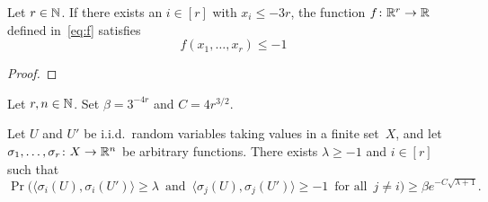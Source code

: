 \begin{lemma}
  \label{lem:special-function-ec}
  Let $r \in \mathbb{N}$. If there exists an $i \in [r]$ with $x_i \le - 3r$, the function $f \colon \mathbb{R}^r \rightarrow \mathbb{R}$ defined in~\eqref{eq:f} satisfies
  $$
  f(x_1,\dots,x_r) \le -1$$
\end{lemma}

\begin{proof}
\end{proof}



\begin{lemma}
  \label{lem:geometric}
  Let $r, n\in\mathbb{N}$. Set $\beta = 3^{-4r}$ and $C = 4r^{3/2}$.

  Let\/ $U$ and\/ $U'$ be i.i.d.~random variables taking values in a finite set~$X$, and let $\sigma_1,\ldots,\sigma_r \colon X \rightarrow \mathbb{R}^n$ be arbitrary functions. There exists $\lambda\ge-1$ and\/ $i\in[r]$ such that
  $$\Pr\Big( \big\langle \sigma_i(U),\sigma_i(U') \big\rangle \ge \lambda \, \text{ and } \, \big\langle \sigma_j(U), \sigma_j(U') \big\rangle \ge -1 \, \text{ for all } \, j \ne i \Big) \ge \beta e^{- C\sqrt{\lambda + 1}}.$$
\end{lemma}

